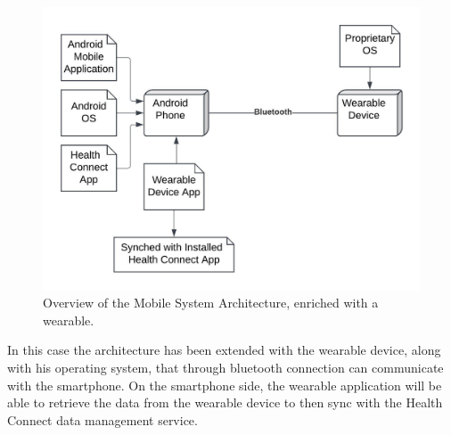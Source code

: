 \begin{figure}
    \includegraphics[width=1.0\linewidth]{./images/system_architecture_wearable.jpeg}
    \caption{Overview of the Mobile System Architecture, enriched with a wearable.}
    \label{fig:systemArchitectureWearables}
\end{figure}

\noindent In this case the architecture has been extended with the wearable device, along with his operating system, that through bluetooth connection can communicate with the smartphone. On the smartphone side, the wearable application will be able to retrieve the data from the wearable device to then sync with the Health Connect data management service.
\newpage
